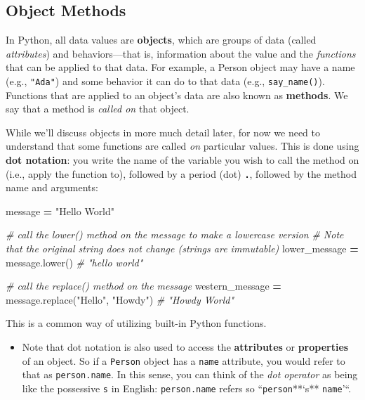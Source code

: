 \documentclass[]{book}
\newenvironment{Shaded}{\begin{snugshade}}{\end{snugshade}}
\newcommand{\StringTok}[1]{\textcolor[rgb]{0.31,0.60,0.02}{#1}}
\newcommand{\CommentTok}[1]{\textcolor[rgb]{0.56,0.35,0.01}{\textit{#1}}}
\newcommand{\OperatorTok}[1]{\textcolor[rgb]{0.81,0.36,0.00}{\textbf{#1}}}
\newcommand{\NormalTok}[1]{#1}
\providecommand{\tightlist}{%
  \setlength{\itemsep}{0pt}\setlength{\parskip}{0pt}}
\begin{document}
\hypertarget{object-methods}{\subsection{Object
Methods}\label{object-methods}}

In Python, all data values are \textbf{objects}, which are groups of
data (called \emph{attributes}) and behaviors---that is, information
about the value and the \emph{functions} that can be applied to that
data. For example, a Person object may have a name (e.g.,
\texttt{"Ada"}) and some behavior it can do to that data (e.g.,
\texttt{say\_name()}). Functions that are applied to an object's data
are also known as \textbf{methods}. We say that a method is \emph{called
on} that object.

While we'll discuss objects in more much detail later, for now we need
to understand that some functions are called \emph{on} particular
values. This is done using \textbf{dot notation}: you write the name of
the variable you wish to call the method on (i.e., apply the function
to), followed by a period (dot) \textbf{\texttt{.}}, followed by the
method name and arguments:

\begin{Shaded}
\begin{Highlighting}[]
\NormalTok{message }\OperatorTok{=} \StringTok{"Hello World"}

\CommentTok{# call the lower() method on the message to make a lowercase version}
\CommentTok{# Note that the original string does not change (strings are immutable)}
\NormalTok{lower_message }\OperatorTok{=}\NormalTok{ message.lower()  }\CommentTok{# "hello world"}

\CommentTok{# call the replace() method on the message}
\NormalTok{western_message }\OperatorTok{=}\NormalTok{ message.replace(}\StringTok{"Hello"}\NormalTok{, }\StringTok{"Howdy"}\NormalTok{)  }\CommentTok{# "Howdy World"}
\end{Highlighting}
\end{Shaded}

This is a common way of utilizing built-in Python functions.

\begin{itemize}
\tightlist
\item
  Note that dot notation is also used to access the \textbf{attributes}
  or \textbf{properties} of an object. So if a \texttt{Person} object
  has a \texttt{name} attribute, you would refer to that as
  \texttt{person.name}. In this sense, you can think of the \emph{dot
  operator} as being like the possessive \texttt{\textquotesingle{}s} in
  English: \texttt{person.name} refers so ``\texttt{person}**`s**
  \texttt{name}'``.
\end{itemize}
\end{document}
